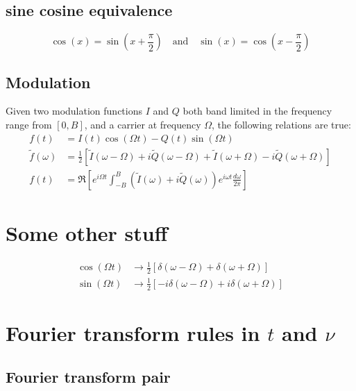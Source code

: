 \documentclass{article}
\begin{document}
\subsection*{sine cosine equivalence}

\begin{equation*}
  \cos(x) = \sin\left(x + \frac{\pi}{2} \right)
  \quad \textrm{and} \quad
  \sin(x) = \cos\left(x - \frac{\pi}{2} \right)
\end{equation*}

\subsection*{Modulation}

Given two modulation functions $I$ and $Q$ both band limited in the frequency range from $[0, B]$, and a carrier at frequency $\Omega$, the following relations are true:
\begin{align*}
  f(t) &= I(t) \cos(\Omega t) - Q(t) \sin(\Omega t) \\
  \tilde{f}(\omega) &= \frac{1}{2} \left[
      \tilde I(\omega - \Omega) + i \tilde Q(\omega - \Omega)
    + \tilde I(\omega + \Omega) - i \tilde Q(\omega + \Omega)
    \right] \\
  f(t) &= \Re \left[
    e^{i \Omega t} \int_{-B}^B \left(
      \tilde{I}(\omega) + i \tilde{Q}(\omega)
    \right) e^{i \omega t} \frac{d \omega}{2 \pi}
  \right]
\end{align*}

\section{Some other stuff}

\begin{align*}
  \cos(\Omega t) &\rightarrow \frac{1}{2} \left[ \delta(\omega - \Omega) + \delta(\omega + \Omega) \right] \\
  \sin(\Omega t) &\rightarrow \frac{1}{2} \left[ -i \delta(\omega - \Omega) + i \delta(\omega + \Omega) \right]
\end{align*}

\section{Fourier transform rules in $t$ and $\nu$}


\subsection{Fourier transform pair}
\end{document}
